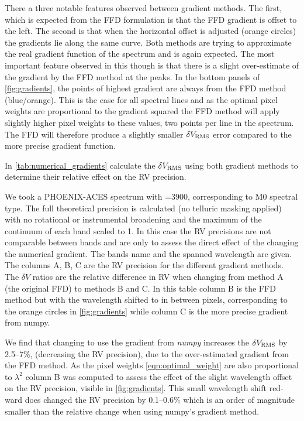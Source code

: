 There a three notable features observed between gradient methods.
The first, which is expected from the {FFD} formulation is that the {FFD} gradient is offset to the left.
The second is that when the horizontal offset is adjusted (orange circles) the gradients lie along the same curve.
Both methods are trying to approximate the real gradient function of the spectrum and is again expected.
The most important feature observed in this though is that there is a slight over-estimate of the gradient by the {FFD} method at the peaks.
In the bottom panels of \cref{fig:gradients}, the points of highest gradient are always from the {FFD} method (blue/orange).
This is the case for all spectral lines and as the optimal pixel weights are proportional to the gradient squared the {FFD} method will apply slightly higher pixel weights to these values, two points per line in the spectrum.
The {FFD} will therefore produce a slightly smaller \(\delta V_{\textrm{RMS}}\) error compared to the more precise gradient function.

In \cref{tab:numerical_gradients}  calculate the  \(\delta V_{\textrm{RMS}}\) using both gradient methods to determine their relative effect on the {RV} precision.

We took a {PHOENIX-ACES} spectrum with \Teff{}=3900\K{}, corresponding to {{M0}} spectral type.
The full theoretical precision is calculated (no telluric masking applied) with no rotational or instrumental broadening and the maximum of the continuum of each band scaled to 1.
In this case the {RV} precisions are not comparable between bands and are only to assess the direct effect of the changing the numerical gradient.
The bands name and the spanned wavelength are given.
The columns A, B, C are the {RV} precision for the different gradient methods.
The \(\delta V\) ratios are the relative difference in {RV} when changing from method A (the original {FFD}) to methods B and C.
In this table column B is the {FFD} method but with the wavelength shifted to in between pixels, corresponding to the orange circles in \cref{fig:gradients} while column C is the more precise gradient from numpy.

We find that changing to use the gradient from \emph{numpy} increases the \(\delta V_{\textrm{RMS}}\) by 2.5--7\%, (decreasing the {RV} precision), due to the over-estimated gradient from the {FFD} method.
As the pixel weights \cref{eqn:optimal_weight} are also proportional to \({\lambda}^{2}\) column B was computed to assess the effect of the slight wavelength offset on the {RV} precision, visible in \cref{fig:gradients}.
This small wavelength shift red-ward does changed the {RV} precision by 0.1--0.6\% which is an order of magnitude smaller than the relative change when using numpy's gradient method.

